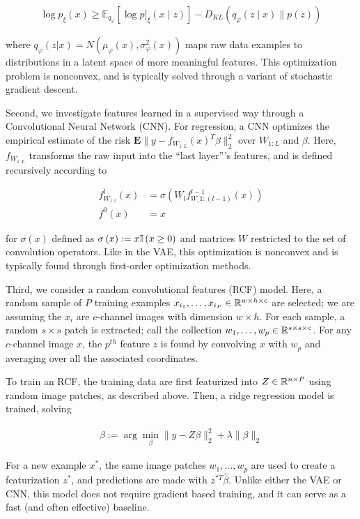\begin{align*}
\log p_{\xi}\left(x\right) \geq  \mathbb{E}_{q_{\varphi}}\left[\log p]_{\xi}(x \mid z)\right]-D_{KL}\left(q_{\varphi}(z \mid x) \| p(z)\right)
\end{align*}

where $q_{\varphi}\left(z \vert x\right) = N\left(\mu_{\varphi}\left(x\right), \sigma^{2}_{\varphi}\left(x\right)\right)$ maps raw data examples to distributions in a latent space of more meaningful features. This optimization problem is nonconvex, and is typically solved through a variant of stochastic gradient descent.

Second, we investigate features learned in a supervised way through a
Convolutional Neural Network (CNN). For regression, a CNN optimizes the
empirical estimate of the risk $\mathbf{E}\|y -
f_{W_{1:L}}\left(x\right)^{T}\beta\|_{2}^{2}$ over $W_{1:L}$ and $\beta$. Here,
$f_{W_{1:L}}$ transforms the raw input into the ``last layer''’s features, and
is defined recursively according to

\begin{align*}
f^{l}_{W_{1:l}}\left(x\right) &= \sigma\left(W_{l}f^{l - 1}_{W\_{1:(l - 1)}}\left(x\right)\right)\\
f^{0}\left(x\right) &= x
\end{align*}

for $\sigma\left(x\right)$ defined as $\sigma\left(x\right) := x \mathbb{I}\left({x \geq
  0}\right)$ and matrices $W$ restricted to the set of convolution operators. Like in
the VAE, this optimization is nonconvex and is typically found through
first-order optimization methods.

Third, we consider a random convolutional features (RCF) model. Here, a random
sample of $P$ training examples $x_{i_1}, \dots, x_{i_P} \in \mathbb{R}^{w \times h
  \times c}$ are selected; we are assuming the $x_{i}$ are $c$-channel images
with dimension $w\times h$. For each sample, a random $s \times s$ patch is
extracted; call the collection $w_{1}, \dots, w_{p} \in \mathbb{R}^{s \times s
  \times c}$. For any $c$-channel image $x$, the $p^{th}$ feature $z$ is found
by convolving $x$ with $w_{p}$ and averaging over all the associated
coordinates.

To train an RCF, the training data are first featurized into $Z \in \mathbb{R}^{n \times P}$ using random image patches, as described above. Then, a ridge regression model is trained, solving

\begin{align*}
\hat{\beta} := \arg \min_{\beta} \|y - Z\beta\|_{2}^{2} + \lambda \|\beta\|_{2}
\end{align*}

For a new example $x^{\ast}$, the same image patches $w_{1}, \dots, w_{p}$ are used to create a featurization $z^{\ast}$, and predictions are made with $z^{\ast T}\hat{\beta}$. Unlike either the VAE or CNN, this model does not require gradient based training, and it can serve as a fast (and often effective) baseline.
